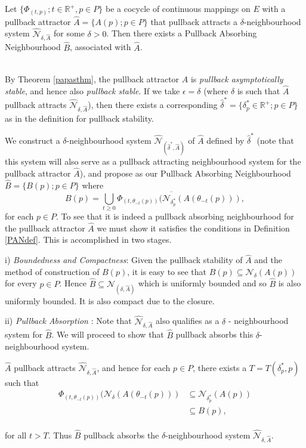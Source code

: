 \begin{therm}
  \label{catabs}
  Let $\{\Phi_{(t,p)};t \in \mathbb{R}^+, p \in P \}$ be a cocycle of
  continuous mappings on $E$ with a pullback attractor $\hat{A} = \{ A(p); p
  \in P \}$ that pullback attracts a $\delta$-neighbourhood system
  $\hat{\mathcal{N}}_{\delta,\hat{A}}$ for some $\delta > 0$. Then there
  exists a Pullback Absorbing Neighbourhood $\hat{B}$, associated with
  $\hat{A}$.
\end{therm}
\begin{prf} \hfill \\
  By Theorem \ref{papasthm}, the pullback attractor $\hat{A}$ is {\em
  pullback asymptotically stable}, and hence also {\em pullback stable}. If
  we take $\epsilon = \delta$ (where $\delta$ is such that $\hat{A}$
  pullback attracts $\hat{\mathcal{N}}_{\delta,\hat{A}}$), then there
  exists a corresponding $\hat{\delta}^* = \{ \delta_p^* \in \mathbb{R}^+ ;
  p \in P \}$ as in the definition for pullback stability.

  We construct a $\delta$-neighbourhood system
  $\hat{\mathcal{N}}_{(\hat{\delta}^*, \hat{A})}$ of $\hat{A}$ defined by
  $\hat{\delta}^*$ (note that this system will also serve as a pullback
  attracting neighbourhood system for the pullback attractor $\hat{A}$),
  and propose as our Pullback Absorbing Neighbourhood $\hat{B} = \{ B(p); p
  \in P \}$ where
  \[ B(p) = \overline{\bigcup_{t \geq 0} \Phi_{(t, \theta_{-t}(p))}
        (\mathcal{N}_{\delta_p^*}(A(\theta_{-t}(p)))}, \]
  for each $p \in P$. To see that it is indeed a pullback absorbing
  neighbourhood for the pullback attractor $\hat{A}$ we must show it
  satisfies the conditions in Definition \ref{PANdef}. This is accomplished
  in two stages.

  \hspace*{3mm} i) {\em Boundedness and Compactness}: Given the
  pullback stability of $\hat{A}$ and the method of construction of $B(p)$,
  it is easy to see that $B(p) \subseteq \mathcal{N}_{\delta}(A(p))$ for
  every $p \in P$. Hence $\hat{B} \subseteq \mathcal{N}_{(\delta,
  \hat{A})}$ which is uniformly bounded and so $\hat{B}$ is also uniformly
  bounded. It is also compact due to the closure.

  \hspace*{3mm} ii) {\em Pullback Absorption} :
  Note that $\hat{\mathcal{N}}_{\delta, \hat{A}}$ also qualifies as a
  $\delta$ - neighbourhood system for $\hat{B}$. We will proceed to show
  that $\hat{B}$ pullback absorbs this $\delta$-neighbourhood system.

  $\hat{A}$ pullback attracts $\hat{\mathcal{N}}_{\delta, \hat{A}}$,
  and hence for each $p \in P$, there exists a $T=T(\delta^*_p, p)$ such
  that
  \begin{align*}
  \Phi_{(t,\theta_{-t}(p))}(\mathcal{N}_{\delta}(A(\theta_{-t}(p)))
  &\subseteq \mathcal{N}_{\delta^*_p}(A(p))\\
  &\subseteq B(p), \\
  \end{align*}

  for all $t > T$. Thus $\hat{B}$ pullback absorbs the
  $\delta$-neighbourhood system $\hat{\mathcal{N}}_{\delta, \hat{A}}$.
\end{prf}

